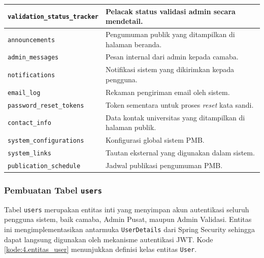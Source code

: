 \begin{longtable}{|L{0.38\textwidth}|L{0.52\textwidth}|}
	\hline
	\texttt{validation\_status\_tracker} & Pelacak status validasi admin secara mendetail. \\
	\hline
	\texttt{announcements} & Pengumuman publik yang ditampilkan di halaman beranda. \\
	\hline
	\texttt{admin\_messages} & Pesan internal dari admin kepada camaba. \\
	\hline
	\texttt{notifications} & Notifikasi sistem yang dikirimkan kepada pengguna. \\
	\hline
	\texttt{email\_log} & Rekaman pengiriman email oleh sistem. \\
	\hline
	\texttt{password\_reset\_tokens} & Token sementara untuk proses \textit{reset} kata sandi. \\
	\hline
	\texttt{contact\_info} & Data kontak universitas yang ditampilkan di halaman publik. \\
	\hline
	\texttt{system\_configurations} & Konfigurasi global sistem PMB. \\
	\hline
	\texttt{system\_links} & Tautan eksternal yang digunakan dalam sistem. \\
	\hline
	\texttt{publication\_schedule} & Jadwal publikasi pengumuman PMB. \\
	\hline
\end{longtable}

\subsubsection{Pembuatan Tabel \texttt{users}} \label{IV.DB.Users}

Tabel \texttt{users} merupakan entitas inti yang menyimpan akun autentikasi seluruh pengguna sistem, baik camaba, Admin Pusat, maupun Admin Validasi. Entitas ini mengimplementasikan antarmuka \texttt{UserDetails} dari Spring Security sehingga dapat langsung digunakan oleh mekanisme autentikasi JWT. Kode \ref{kode:4.entitas_user} menunjukkan definisi kelas entitas \texttt{User}.\par

